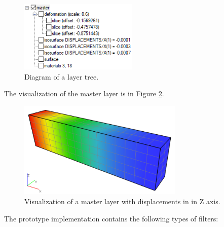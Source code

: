 \begin{figure}[H]
    \centering
    \includegraphics[width=0.5\textwidth]{figures/chapter-data-management/layers-tree-diagram}
    \decoRule
    \caption{Diagram of a layer tree.}
    \label{fig:layers-tree}
\end{figure}

The visualization of the master layer is in Figure \ref{fig:beam-master-layer}.

\begin{figure}[H]
    \centering
    \includegraphics[width=0.7\textwidth]{figures/chapter-data-management/beam-master-layer}
    \decoRule
    \caption[Visualization of a master layer]{Visualization of a master layer with displacements in in Z axis.}
    \label{fig:beam-master-layer}
\end{figure}

The prototype implementation contains the following types of filters:


